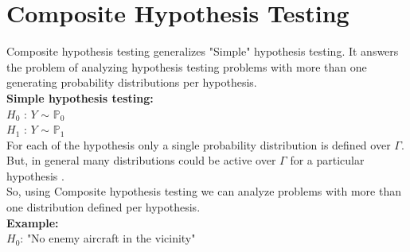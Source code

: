 \documentclass[12pt]{report}
\begin{document}
\section{Composite Hypothesis Testing}
Composite hypothesis testing generalizes "Simple" hypothesis testing. It answers the problem of analyzing hypothesis testing problems with more than one generating probability distributions per hypothesis.\\[50pt]
{\bf Simple hypothesis testing:} \\
$H_0$ : $Y$  $\sim$ $\mathbb{P}_0$\\
$H_1$ : $Y$  $\sim$ $\mathbb{P}_1$ \\
For each of the hypothesis only a single probability distribution is defined over $\Gamma$.\\
But, in general many distributions could be active over $\Gamma$ for a particular hypothesis .\\
So, using Composite hypothesis testing we can analyze problems with more than one distribution defined per hypothesis.\\[10pt]
\textbf{Example:}\\
$H_0$: "No enemy aircraft in the vicinity"\\
\end{document}
